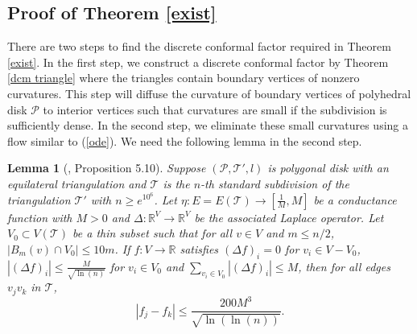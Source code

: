 \documentclass[12pt]{amsart}
\newtheorem{lemma}[theorem]{Lemma}
\def\R{\mathbb{R}}
\def\T{\mathcal{T}}
\begin{document}
\subsection{Proof of Theorem \ref{exist}}
    There are two steps to find the discrete conformal factor required in Theorem \ref{exist}. In the first step, we construct a discrete conformal factor by Theorem \ref{dcm triangle} where the triangles contain boundary vertices of nonzero curvatures. This step will diffuse the curvature of boundary vertices of polyhedral disk $\mathcal{P}$ to interior vertices such that curvatures are small if the subdivision is sufficiently dense. In the second step, we eliminate these small curvatures using a flow similar to (\ref{ode}). We need the following lemma in the second step.



  \begin{lemma}[\cite{LSW}, Proposition 5.10] \label{estimate4} Suppose $(\mathcal P, \T', l)$ is
	polygonal disk  with an equilateral triangulation and
	$\T$ is the $n$-th standard subdivision of the triangulation
	$\T'$ with $n \geq e^{10^6}$. Let $\eta: E=E(\T) \to [\frac{1}{M},
	M]$ be a conductance function with $M>0$ and $\Delta: \R^V \to \R^V$ be the
	associated Laplace operator.  Let
	$V_0 \subset V(\T)$ be a thin subset such that for all $v \in V$ and
	$m \leq n/2$, $|B_m(v) \cap V_0| \leq 10m$.   If $f: V \to \R$
	satisfies $(\Delta f)_i=0$ for $v_i \in V-V_0$, $|(\Delta f)_i| \leq
	\frac{M}{\sqrt{\ln(n)}}$ for  $v_i \in V_0$ and $\sum_{v_i \in V_0}
	|(\Delta f)_i| \leq M$, then for all edges $v_jv_k$ in $\T$,
	$$|f_j-f_k| \leq \frac{200M^3}{\sqrt{\ln(\ln(n))}}.$$
    \end{lemma}
\end{document}
